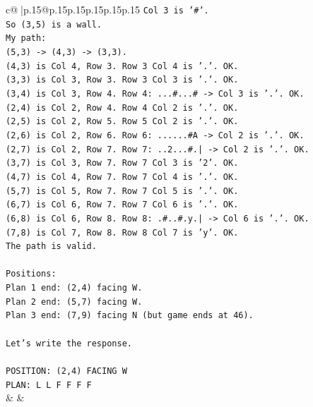 \documentclass{article}
\begin{document}
{\begin{supertabular}{c@{$\;$}|p{.15\linewidth}@{}p{.15\linewidth}p{.15\linewidth}p{.15\linewidth}p{.15\linewidth}p{.15\linewidth}}
{{{\texttt{Col 3 is '\#'.} \\
\texttt{So (3,5) is a wall.} \\
\texttt{My path:} \\
\texttt{(5,3) {-}> (4,3) {-}> (3,3).} \\
\texttt{(4,3) is Col 4, Row 3. Row 3 Col 4 is '.'. OK.} \\
\texttt{(3,3) is Col 3, Row 3. Row 3 Col 3 is '.'. OK.} \\
\texttt{(3,4) is Col 3, Row 4. Row 4: ...\#...\# {-}> Col 3 is '.'. OK.} \\
\texttt{(2,4) is Col 2, Row 4. Row 4 Col 2 is '.'. OK.} \\
\texttt{(2,5) is Col 2, Row 5. Row 5 Col 2 is '.'. OK.} \\
\texttt{(2,6) is Col 2, Row 6. Row 6: ......\#A {-}> Col 2 is '.'. OK.} \\
\texttt{(2,7) is Col 2, Row 7. Row 7: ..2...\#.| {-}> Col 2 is '.'. OK.} \\
\texttt{(3,7) is Col 3, Row 7. Row 7 Col 3 is '2'. OK.} \\
\texttt{(4,7) is Col 4, Row 7. Row 7 Col 4 is '.'. OK.} \\
\texttt{(5,7) is Col 5, Row 7. Row 7 Col 5 is '.'. OK.} \\
\texttt{(6,7) is Col 6, Row 7. Row 7 Col 6 is '.'. OK.} \\
\texttt{(6,8) is Col 6, Row 8. Row 8: .\#..\#.y.| {-}> Col 6 is '.'. OK.} \\
\texttt{(7,8) is Col 7, Row 8. Row 8 Col 7 is 'y'. OK.} \\
\texttt{The path is valid.} \\
\\ 
\texttt{Positions:} \\
\texttt{Plan 1 end: (2,4) facing W.} \\
\texttt{Plan 2 end: (5,7) facing W.} \\
\texttt{Plan 3 end: (7,9) facing N (but game ends at 46).} \\
\\ 
\texttt{Let's write the response.} \\
\\ 
\texttt{POSITION: (2,4) FACING W} \\
\texttt{PLAN: L L F F F F} \\
            }
        }
    }
    & & \\ \\


\end{supertabular}}
\end{document}
